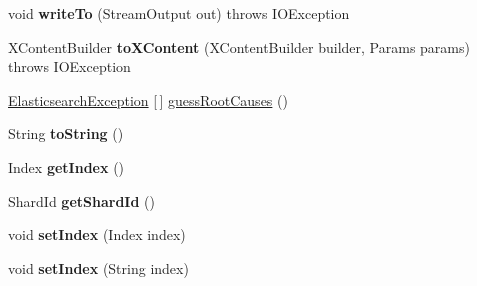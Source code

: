 \begin{DoxyCompactItemize}
\item 
\hypertarget{classorg_1_1elasticsearch_1_1_elasticsearch_exception_a986086b6af724b62a245025a3f61a598}{}\label{classorg_1_1elasticsearch_1_1_elasticsearch_exception_a986086b6af724b62a245025a3f61a598} 
void {\bfseries write\+To} (Stream\+Output out)  throws I\+O\+Exception 
\item 
\hypertarget{classorg_1_1elasticsearch_1_1_elasticsearch_exception_a61f3e61b4485ddc1952fe4f3cf33fdee}{}\label{classorg_1_1elasticsearch_1_1_elasticsearch_exception_a61f3e61b4485ddc1952fe4f3cf33fdee} 
X\+Content\+Builder {\bfseries to\+X\+Content} (X\+Content\+Builder builder, Params params)  throws I\+O\+Exception 
\item 
\hyperlink{classorg_1_1elasticsearch_1_1_elasticsearch_exception}{Elasticsearch\+Exception} \mbox{[}$\,$\mbox{]} \hyperlink{classorg_1_1elasticsearch_1_1_elasticsearch_exception_aeda2312a330ae7c768410dafe13205e0}{guess\+Root\+Causes} ()
\item 
\hypertarget{classorg_1_1elasticsearch_1_1_elasticsearch_exception_a4eb4eeec440607f9c0bca7ec81016915}{}\label{classorg_1_1elasticsearch_1_1_elasticsearch_exception_a4eb4eeec440607f9c0bca7ec81016915} 
String {\bfseries to\+String} ()
\item 
\hypertarget{classorg_1_1elasticsearch_1_1_elasticsearch_exception_a7ff81e29624da75c45dfc9a26be82a4c}{}\label{classorg_1_1elasticsearch_1_1_elasticsearch_exception_a7ff81e29624da75c45dfc9a26be82a4c} 
Index {\bfseries get\+Index} ()
\item 
\hypertarget{classorg_1_1elasticsearch_1_1_elasticsearch_exception_ae9812bf2070dc9f33ecc37685e161f9b}{}\label{classorg_1_1elasticsearch_1_1_elasticsearch_exception_ae9812bf2070dc9f33ecc37685e161f9b} 
Shard\+Id {\bfseries get\+Shard\+Id} ()
\item 
\hypertarget{classorg_1_1elasticsearch_1_1_elasticsearch_exception_aba948242219b4ae9d3c03344706a5c9a}{}\label{classorg_1_1elasticsearch_1_1_elasticsearch_exception_aba948242219b4ae9d3c03344706a5c9a} 
void {\bfseries set\+Index} (Index index)
\item 
\hypertarget{classorg_1_1elasticsearch_1_1_elasticsearch_exception_a36dfe313effcd3f3347683ad108e48c5}{}\label{classorg_1_1elasticsearch_1_1_elasticsearch_exception_a36dfe313effcd3f3347683ad108e48c5} 
void {\bfseries set\+Index} (String index)
\item 
\hypertarget{classorg_1_1elasticsearch_1_1_elasticsearch_exception_abacd08f4449cc7f4fc07f63b52cb6897}{}\label{classorg_1_1elasticsearch_1_1_elasticsearch_exception_abacd08f4449cc7f4fc07f63b52cb6897} 

\end{DoxyCompactItemize}
